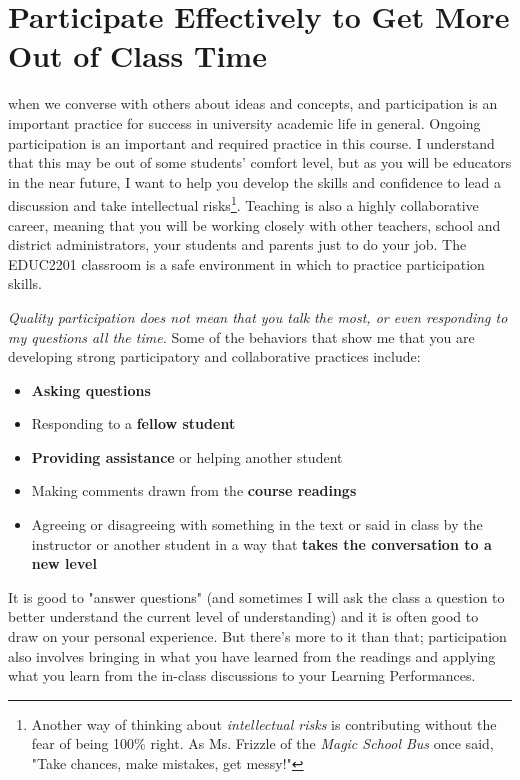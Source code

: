 \documentclass{tufte-handout}
\begin{document}
\section{Participate Effectively to Get More Out of Class Time}
 when we converse with others about ideas and concepts, and participation is an important practice for success in university academic life in general. Ongoing participation is an important and required practice in this course. I understand that this may be out of some students' comfort level, but as you will be educators in the near future, I want to help you develop the skills and confidence to lead a discussion and take intellectual risks\footnote{Another way of thinking about \textit{intellectual risks} is contributing without the fear of being 100\% right. As Ms. Frizzle of the \textit{Magic School Bus} once said, "Take chances, make mistakes, get messy!"}. Teaching is also a highly collaborative career, meaning that you will be working closely with other teachers, school and district administrators, your students and parents just to do your job. The EDUC2201 classroom is a safe environment in which to practice participation skills.

\emph{Quality participation does not mean that you talk the most, or even responding to my questions all the time.} Some of the behaviors that show me that you are developing strong participatory and collaborative practices include:
\begin{itemize}
	\itemsep-0.5em
	\item \textbf{Asking questions}
	\item Responding to a \textbf{fellow student}
	\item \textbf{Providing assistance} or helping another student
	\item Making comments drawn from the \textbf{course readings}
	\item Agreeing or disagreeing with something in the text or said in class by the instructor or another student in a way that \textbf{takes the conversation to a new level}
\end{itemize}
It is good to "answer questions" (and sometimes I will ask the class a question to better understand the current level of understanding) and it is often good to draw on your personal experience. But there's more to it than that; participation also involves bringing in what you have learned from the readings and applying what you learn from the in-class discussions to your Learning Performances.
\end{document}

